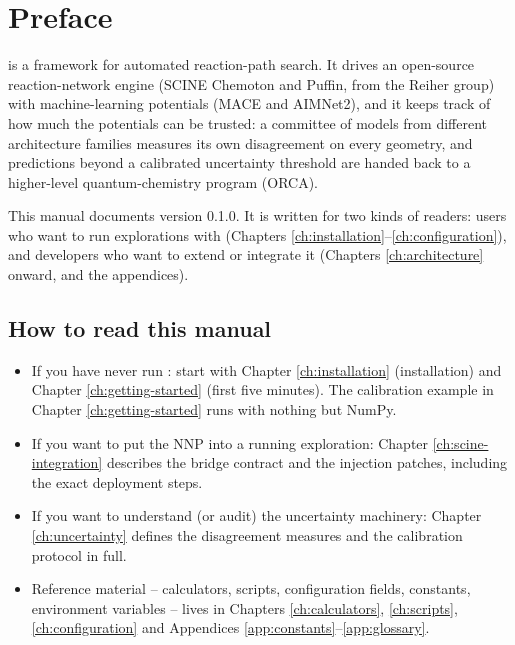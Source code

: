 \chapter{Preface}

\jns{} is a framework for automated reaction-path search.  It drives an
open-source reaction-network engine (SCINE Chemoton and Puffin, from the
Reiher group) with machine-learning potentials (MACE and AIMNet2), and it
keeps track of how much the potentials can be trusted: a committee of models
from different architecture families measures its own disagreement on every
geometry, and predictions beyond a calibrated uncertainty threshold are
handed back to a higher-level quantum-chemistry program (ORCA).

This manual documents version 0.1.0.  It is written for two kinds of
readers: users who want to run explorations with \jns{} (Chapters
\ref{ch:installation}--\ref{ch:configuration}), and developers who want to
extend or integrate it (Chapters \ref{ch:architecture} onward, and the
appendices).

\section*{How to read this manual}

\begin{readbox}
\begin{itemize}
  \item If you have never run \jns{}: start with Chapter
    \ref{ch:installation} (installation) and Chapter
    \ref{ch:getting-started} (first five minutes).  The calibration example
    in Chapter \ref{ch:getting-started} runs with nothing but NumPy.
  \item If you want to put the NNP into a running exploration: Chapter
    \ref{ch:scine-integration} describes the bridge contract and the
    injection patches, including the exact deployment steps.
  \item If you want to understand (or audit) the uncertainty machinery:
    Chapter \ref{ch:uncertainty} defines the disagreement measures and the
    calibration protocol in full.
  \item Reference material -- calculators, scripts, configuration fields,
    constants, environment variables -- lives in Chapters
    \ref{ch:calculators}, \ref{ch:scripts}, \ref{ch:configuration} and
    Appendices \ref{app:constants}--\ref{app:glossary}.
\end{itemize}
\end{readbox}

